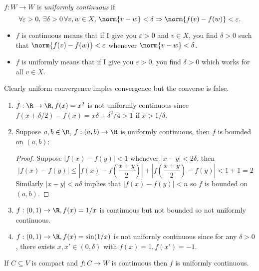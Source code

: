 \documentclass[a4paper]{article}
\theoremstyle{definition}
\begin{document}
\begin{definition}
  \(f: W \to W\) is \emph{uniformly continuous} if
  \[
    \forall \varepsilon>0, \, \exists \delta>0 \, \forall v, w \in X, \, \norm{v - w} < \delta \Rightarrow \norm{f(v) - f(w)} < \varepsilon.
  \]
\end{definition}

\begin{note}\leavevmode
  \begin{itemize}
  \item \(f\) is continuous means that if I give you \(\varepsilon > 0\) and \(v \in X\), you find \(\delta > 0\) such that \(\norm{f(v) - f(w)} < \varepsilon\) whenever \(\norm{v - w} < \delta\).
  \item \(f\) is uniformly means that if I give you \(\varepsilon > 0\), you find \(\delta > 0\) which works for all \(v \in X\).
  \end{itemize}
\end{note}

Clearly uniform convergence imples convergence but the converse is false.

\begin{eg}\leavevmode
  \begin{enumerate}
  \item \(f: \R \to \R, f(x) = x^2\) is not uniformly continuous since \(f(x + \delta/2) - f(x) = x \delta + \delta^2/4 > 1\) if \(x > 1/\delta\).
  \item Suppose \(a, b \in \R\), \(f: (a, b) \to \R\) is uniformly continuous, then \(f\) is bounded on \((a, b)\):
    \begin{proof}
      Suppose \(|f(x) - f(y)| < 1\) whenever \(|x - y| < 2 \delta\), then
      \[
        |f(x) - f(y)| \leq \left| f(x) - f(\frac{x+y}{2}) \right| + \left| f(\frac{x+y}{2}) - f(y) \right| < 1 + 1 = 2
      \]
      Similarly \(|x - y| < n \delta\) implies that \(|f(x) - f(y)| < n\) so \(f\) is bounded on \((a, b)\).
    \end{proof}
    \item \(f:(0, 1) \to \R, f(x) = 1/x\) is continuous but not bounded so not uniformly continuous.
    \item \(f:(0, 1) \to \R, f(x) = \sin(1/x)\) is not unifornly continuous since for any \(\delta > 0\), there exists \(x, x' \in(0, \delta)\) with \(f(x) = 1, f(x') = -1\).
  \end{enumerate}
\end{eg}

\begin{theorem}
  If \(C \subseteq V\) is compact and \(f: C \to W\) is continuous then \(f\) is uniformly continuous.
\end{theorem}
\end{document}
